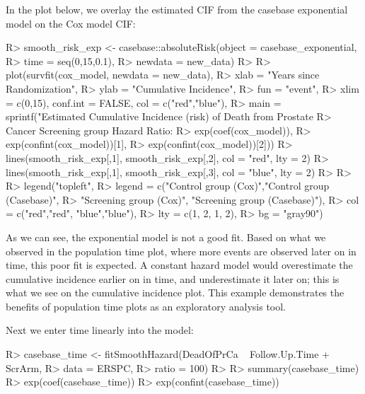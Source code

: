 \documentclass[
]{jss}
\begin{document}
In the plot below, we overlay the estimated CIF from the casebase
exponential model on the Cox model CIF:

\begin{CodeChunk}

\begin{CodeInput}
R> smooth_risk_exp <- casebase::absoluteRisk(object = casebase_exponential, 
R>                                           time = seq(0,15,0.1), 
R>                                           newdata = new_data)
R> 
R> plot(survfit(cox_model, newdata = new_data),
R>      xlab = "Years since Randomization", 
R>      ylab = "Cumulative Incidence", 
R>      fun = "event",
R>      xlim = c(0,15), conf.int = FALSE, col = c("red","blue"), 
R>      main = sprintf("Estimated Cumulative Incidence (risk) of Death from Prostate 
R>                     Cancer Screening group Hazard Ratio: %
R>                     exp(coef(cox_model)), 
R>                     exp(confint(cox_model))[1], 
R>                     exp(confint(cox_model))[2]))
R> lines(smooth_risk_exp[,1], smooth_risk_exp[,2], col = "red", lty = 2)
R> lines(smooth_risk_exp[,1], smooth_risk_exp[,3], col = "blue", lty = 2)
R> 
R> 
R> legend("topleft", 
R>        legend = c("Control group (Cox)","Control group (Casebase)",
R>                   "Screening group (Cox)", "Screening group (Casebase)"), 
R>        col = c("red","red", "blue","blue"),
R>        lty = c(1, 2, 1, 2), 
R>        bg = "gray90")
\end{CodeInput}
\end{CodeChunk}

As we can see, the exponential model is not a good fit. Based on what we
observed in the population time plot, where more events are observed
later on in time, this poor fit is expected. A constant hazard model
would overestimate the cumulative incidence earlier on in time, and
underestimate it later on; this is what we see on the cumulative
incidence plot. This example demonstrates the benefits of population
time plots as an exploratory analysis tool.

Next we enter time linearly into the model:

\begin{CodeChunk}

\begin{CodeInput}
R> casebase_time <- fitSmoothHazard(DeadOfPrCa ~ Follow.Up.Time + ScrArm, 
R>                                  data = ERSPC, 
R>                                  ratio = 100)
R> 
R> summary(casebase_time)
R> exp(coef(casebase_time))
R> exp(confint(casebase_time))
\end{CodeInput}
\end{CodeChunk}
\end{document}
